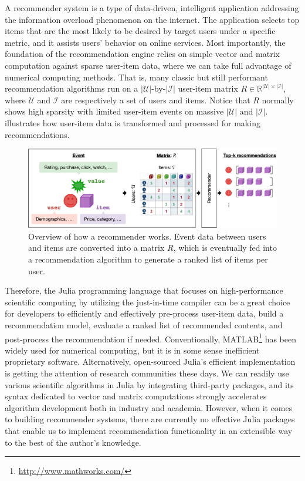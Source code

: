A recommender system is a type of data-driven, intelligent application addressing the information overload phenomenon on the internet. The application selects top items that are the most likely to be desired by target users under a specific metric, and it assists users' behavior on online services. Most importantly, the foundation of the recommendation engine relies on simple vector and matrix computation against sparse user-item data, where we can take full advantage of numerical computing methods. That is, many classic but still performant recommendation algorithms run on a $|\mathcal{U}|$-by-$|\mathcal{I}|$ user-item matrix $R \in \mathbb{R}^{|\mathcal{U}| \times |\mathcal{I}|}$, where $\mathcal{U}$ and $\mathcal{I}$ are respectively a set of users and items. Notice that $R$ normally shows high sparsity with limited user-item events on massive $|\mathcal{U}|$ and $|\mathcal{I}|$.  illustrates how user-item data is transformed and processed for making recommendations.

\begin{figure}[htbp]
    \centering
    \includegraphics[width=1.0\linewidth]{images/recommender.pdf}
    \caption{Overview of how a recommender works. Event data between users and items are converted into a matrix $R$, which is eventually fed into a recommendation algorithm to generate a ranked list of items per user.}
    \label{fig:recommender}
\end{figure}

Therefore, the Julia programming language that focuses on high-performance scientific computing by utilizing the just-in-time compiler \cite{bezanson2017julia} can be a great choice for developers to efficiently and effectively pre-process user-item data, build a recommendation model, evaluate a ranked list of recommended contents, and post-process the recommendation if needed. Conventionally, MATLAB\footnote{\url{http://www.mathworks.com/}} has been widely used for numerical computing, but it is in some sense inefficient proprietary software. Alternatively, open-sourced Julia's efficient implementation is getting the attention of research communities these days. We can readily use various scientific algorithms in Julia by integrating third-party packages, and its syntax dedicated to vector and matrix computations strongly accelerates algorithm development both in industry and academia. However, when it comes to building recommender systems, there are currently no effective Julia packages that enable us to implement recommendation functionality in an extensible way to the best of the author's knowledge.

